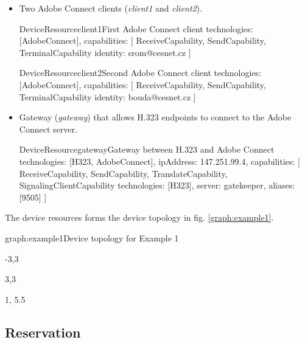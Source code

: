 \begin{itemize}
\item Two Adobe Connect clients (\emph{client1} and \emph{client2}).

\begin{ResourceExample}{DeviceResource}{client1}{First Adobe Connect client}
technologies: [AdobeConnect], 
capabilities: [
  ReceiveCapability, SendCapability,
  TerminalCapability {identity: srom@cesnet.cz}
]
\end{ResourceExample}

\begin{ResourceExample}{DeviceResource}{client2}{Second Adobe Connect client}
technologies: [AdobeConnect], 
capabilities: [
  ReceiveCapability, SendCapability,
  TerminalCapability {identity: bouda@cesnet.cz}
]
\end{ResourceExample}

\item Gateway (\emph{gateway}) that allows H.323 endpoints to connect to
  the Adobe Connect server.
    
\begin{ResourceExample}{DeviceResource}{gateway}{Gateway between H.323 and Adobe Connect}
technologies: [H323, AdobeConnect], 
ipAddress: 147.251.99.4,
capabilities: [
  ReceiveCapability, SendCapability,
  TranslateCapability,
  SignalingClientCapability {technologies: [H323], server: gatekeeper, 
     aliases: [9505]}
]
\end{ResourceExample}

\end{itemize}

The device resources forms the device topology in fig. \ref{graph:example1}. 

\begin{Graph}{graph:example1}{Device topology for Example 1}  
  \begin{SubGraph}{-3,3}{}
  \end{SubGraph}
  
  \begin{SubGraph}{3,3}{}
  \end{SubGraph}
  
  
  \begin{GraphLegend}{1, 5.5}
  \end{GraphLegend}
\end{Graph}

\subsection{Reservation}

 \\
 \\
